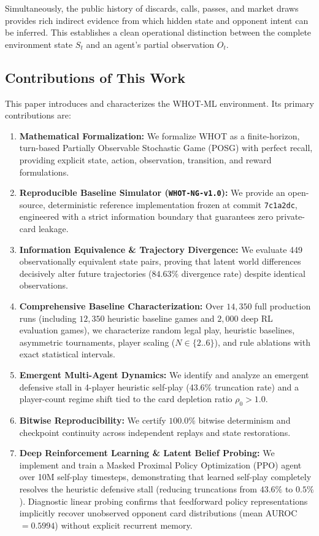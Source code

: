\documentclass[11pt]{article}
\begin{document}
Simultaneously, the public history of discards, calls, passes, and market draws provides rich indirect evidence from which hidden state and opponent intent can be inferred. This establishes a clean operational distinction between the complete environment state $S_t$ and an agent's partial observation $O_t$.

\subsection{Contributions of This Work}
This paper introduces and characterizes the WHOT-ML environment. Its primary contributions are:
\begin{enumerate}
  \item \textbf{Mathematical Formalization:} We formalize WHOT as a finite-horizon, turn-based Partially Observable Stochastic Game (POSG) with perfect recall, providing explicit state, action, observation, transition, and reward formulations.
  \item \textbf{Reproducible Baseline Simulator (\texttt{WHOT-NG-v1.0}):} We provide an open-source, deterministic reference implementation frozen at commit \texttt{7c1a2dc}, engineered with a strict information boundary that guarantees zero private-card leakage.
  \item \textbf{Information Equivalence \& Trajectory Divergence:} We evaluate 449 observationally equivalent state pairs, proving that latent world differences decisively alter future trajectories ($84.63\%$ divergence rate) despite identical observations.
  \item \textbf{Comprehensive Baseline Characterization:} Over $14{,}350$ full production runs (including $12{,}350$ heuristic baseline games and $2{,}000$ deep RL evaluation games), we characterize random legal play, heuristic baselines, asymmetric tournaments, player scaling ($N \in \{2..6\}$), and rule ablations with exact statistical intervals.
  \item \textbf{Emergent Multi-Agent Dynamics:} We identify and analyze an emergent defensive stall in 4-player heuristic self-play (43.6\% truncation rate) and a player-count regime shift tied to the card depletion ratio $\rho_0 > 1.0$.
  \item \textbf{Bitwise Reproducibility:} We certify $100.0\%$ bitwise determinism and checkpoint continuity across independent replays and state restorations.
  \item \textbf{Deep Reinforcement Learning \& Latent Belief Probing:} We implement and train a Masked Proximal Policy Optimization (PPO) agent over 10M self-play timesteps, demonstrating that learned self-play completely resolves the heuristic defensive stall (reducing truncations from $43.6\%$ to $0.5\%$). Diagnostic linear probing confirms that feedforward policy representations implicitly recover unobserved opponent card distributions (mean AUROC $= 0.5994$) without explicit recurrent memory.
\end{enumerate}
\end{document}
